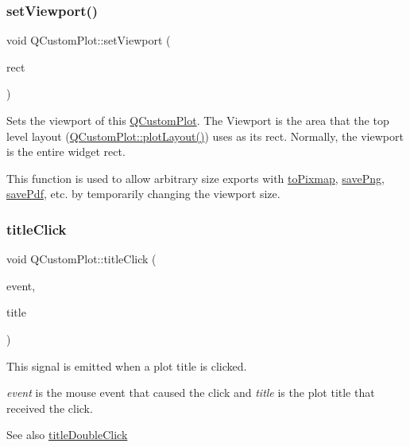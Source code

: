 \subsubsection{\texorpdfstring{set\+Viewport()}{setViewport()}}
{\footnotesize\ttfamily void Q\+Custom\+Plot\+::set\+Viewport (\begin{DoxyParamCaption}\item[{const Q\+Rect \&}]{rect }\end{DoxyParamCaption})}

Sets the viewport of this \mbox{\hyperlink{class_q_custom_plot}{Q\+Custom\+Plot}}. The Viewport is the area that the top level layout (\mbox{\hyperlink{class_q_custom_plot_af1a1f1f571237deb7c2bd34a5e9f018f}{Q\+Custom\+Plot\+::plot\+Layout()}}) uses as its rect. Normally, the viewport is the entire widget rect.

This function is used to allow arbitrary size exports with \mbox{\hyperlink{class_q_custom_plot_aabb974d71ce96c137dc04eb6eab844fe}{to\+Pixmap}}, \mbox{\hyperlink{class_q_custom_plot_a7636261aff1f6d25c9da749ece3fc8b8}{save\+Png}}, \mbox{\hyperlink{class_q_custom_plot_a632da44c6d94ea8b271eb483b08b5114}{save\+Pdf}}, etc. by temporarily changing the viewport size. \mbox{\label{class_q_custom_plot_a2137a819e518fee7edd1c0bf5984d8d6}} 
\subsubsection{\texorpdfstring{title\+Click}{titleClick}}
{\footnotesize\ttfamily void Q\+Custom\+Plot\+::title\+Click (\begin{DoxyParamCaption}\item[{Q\+Mouse\+Event $\ast$}]{event,  }\item[{\mbox{\hyperlink{class_q_c_p_plot_title}{Q\+C\+P\+Plot\+Title}} $\ast$}]{title }\end{DoxyParamCaption})\hspace{0.3cm}{\ttfamily [signal]}}

This signal is emitted when a plot title is clicked.

{\itshape event} is the mouse event that caused the click and {\itshape title} is the plot title that received the click.

\begin{DoxySeeAlso}{See also}
\mbox{\hyperlink{class_q_custom_plot_ad51d65f6abf5edfaeef6e0519a4c1a2f}{title\+Double\+Click}} 
\end{DoxySeeAlso}
\mbox{\label{class_q_custom_plot_ad51d65f6abf5edfaeef6e0519a4c1a2f}} 
